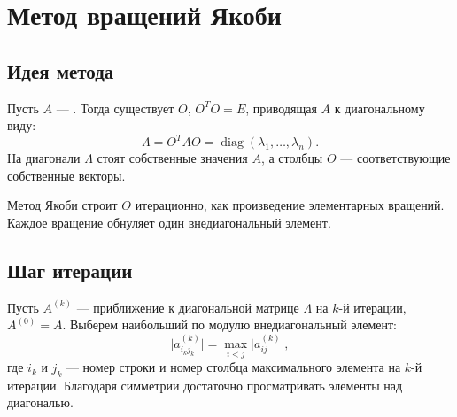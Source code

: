 \documentclass[../final.tex]{subfiles}
\begin{document}

\section{Метод вращений Якоби}

\subsection{Идея метода}

Пусть $A$ --- .
Тогда существует  $O$, $O^TO=E$,
приводящая $A$ к диагональному виду:
\begin{equation*}
    \Lambda=O^TAO=\operatorname{diag}(\lambda_1,\ldots,\lambda_n).
\end{equation*}
На диагонали $\Lambda$ стоят собственные значения $A$,
а столбцы $O$ --- соответствующие собственные векторы.

Метод Якоби строит $O$ итерационно, как произведение элементарных
вращений. Каждое вращение обнуляет один внедиагональный элемент.

\subsection{Шаг итерации}

Пусть $A^{(k)}$ --- приближение к диагональной матрице $\Lambda$
на $k$-й итерации, $A^{(0)}=A$. Выберем наибольший по модулю
внедиагональный элемент:
\begin{equation*}
    \bigl|a^{(k)}_{i_kj_k}\bigr|=\max_{i<j}\bigl|a^{(k)}_{ij}\bigr|,
\end{equation*}
где $i_k$ и $j_k$ --- номер строки и номер столбца максимального
элемента на $k$-й итерации. Благодаря симметрии достаточно
просматривать элементы над диагональю.
\end{document}
